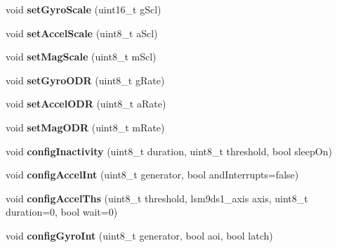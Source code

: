 \begin{DoxyCompactItemize}
\item 
void {\bfseries set\+Gyro\+Scale} (uint16\+\_\+t g\+Scl)\hypertarget{classLSM9DS1_a115d304ebcdc8c701f3e5a5d397250aa}{}\label{classLSM9DS1_a115d304ebcdc8c701f3e5a5d397250aa}

\item 
void {\bfseries set\+Accel\+Scale} (uint8\+\_\+t a\+Scl)\hypertarget{classLSM9DS1_a8656d2de1ff9cc4cb76214e4561d02c4}{}\label{classLSM9DS1_a8656d2de1ff9cc4cb76214e4561d02c4}

\item 
void {\bfseries set\+Mag\+Scale} (uint8\+\_\+t m\+Scl)\hypertarget{classLSM9DS1_ad7604159a07b0d088cdfb6ba4a0093b0}{}\label{classLSM9DS1_ad7604159a07b0d088cdfb6ba4a0093b0}

\item 
void {\bfseries set\+Gyro\+O\+DR} (uint8\+\_\+t g\+Rate)\hypertarget{classLSM9DS1_ab8fc33c8da4fc5c379e880ff57d331fa}{}\label{classLSM9DS1_ab8fc33c8da4fc5c379e880ff57d331fa}

\item 
void {\bfseries set\+Accel\+O\+DR} (uint8\+\_\+t a\+Rate)\hypertarget{classLSM9DS1_a76d72839cdecc3f1c4ee6fff578182c5}{}\label{classLSM9DS1_a76d72839cdecc3f1c4ee6fff578182c5}

\item 
void {\bfseries set\+Mag\+O\+DR} (uint8\+\_\+t m\+Rate)\hypertarget{classLSM9DS1_a8bc672fba680edc468a643fd58046b41}{}\label{classLSM9DS1_a8bc672fba680edc468a643fd58046b41}

\item 
void {\bfseries config\+Inactivity} (uint8\+\_\+t duration, uint8\+\_\+t threshold, bool sleep\+On)\hypertarget{classLSM9DS1_a1e318c5e7c1d500c3ab2602c46265354}{}\label{classLSM9DS1_a1e318c5e7c1d500c3ab2602c46265354}

\item 
void {\bfseries config\+Accel\+Int} (uint8\+\_\+t generator, bool and\+Interrupts=false)\hypertarget{classLSM9DS1_a1e8ebc6c1e3876d8936197dc93f76717}{}\label{classLSM9DS1_a1e8ebc6c1e3876d8936197dc93f76717}

\item 
void {\bfseries config\+Accel\+Ths} (uint8\+\_\+t threshold, lsm9ds1\+\_\+axis axis, uint8\+\_\+t duration=0, bool wait=0)\hypertarget{classLSM9DS1_acebcf64ab4e6ea7ed7a23c09ef16afe9}{}\label{classLSM9DS1_acebcf64ab4e6ea7ed7a23c09ef16afe9}

\item 
void {\bfseries config\+Gyro\+Int} (uint8\+\_\+t generator, bool aoi, bool latch)\hypertarget{classLSM9DS1_a19a341728c4e5b454de045c8a531cf06}{}\label{classLSM9DS1_a19a341728c4e5b454de045c8a531cf06}


\end{DoxyCompactItemize}
